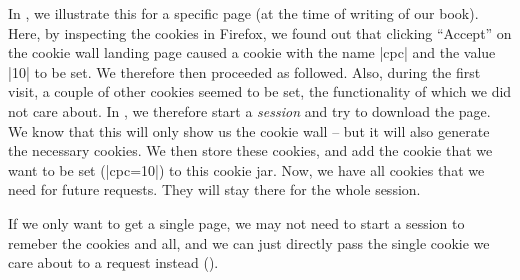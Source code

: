 In , we illustrate this for a specific page (at the
time of writing of our book). Here, by inspecting the cookies in Firefox,
we found out that clicking ``Accept'' on the cookie wall landing page
caused a cookie with the name |cpc| and the value |10| to be set. We
therefore then proceeded as followed. Also, during the first visit,
a couple of other cookies seemed to be set, the functionality of which
we did not care about. In , we therefore start a \emph{session}
and try to download the page. We know that this will only show us the
cookie wall -- but it will also generate the necessary cookies. We then
store these cookies, and add the cookie that we want to be set (|cpc=10|)
to this cookie jar. Now, we have all cookies that we need for future
requests. They will stay there for the whole session.

If we only want to get a single page, we may not need to start a session
to remeber the cookies and all, and we can just directly pass the single
cookie we care about to a request instead ().









